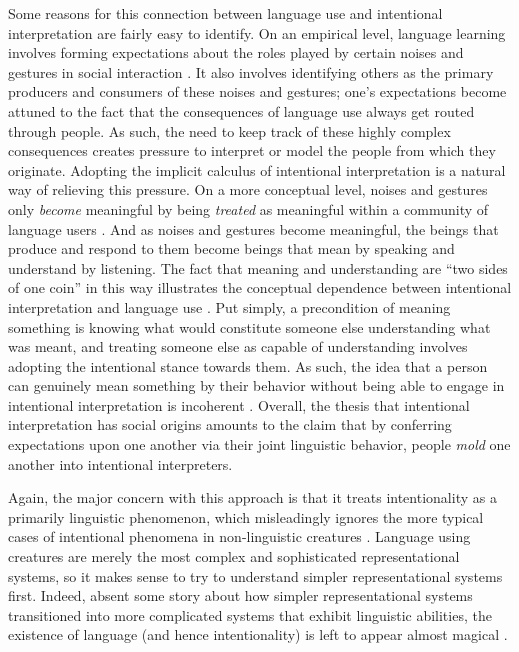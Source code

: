 Some reasons for this connection between language use and intentional interpretation are fairly easy to identify. On an empirical level, language learning involves forming expectations about the roles played by certain noises and gestures in social interaction \citep{Tomasello:2005,Tomasello:2003}. It also involves identifying others as the primary producers and consumers of these noises and gestures; one's expectations become attuned to the fact that the consequences of language use always get routed through people. As such, the need to keep track of these highly complex consequences creates pressure to interpret or model the people from which they originate. Adopting the implicit calculus of intentional interpretation is a natural way of relieving this pressure. On a more conceptual level, noises and gestures only \textit{become} meaningful by being \textit{treated} as meaningful within a community of language users \citep{Brandom:1994}. And as noises and gestures become meaningful, the beings that produce and respond to them become beings that mean by speaking and understand by listening. The fact that meaning and understanding are ``two sides of one coin'' in this way illustrates the conceptual dependence between intentional interpretation and language use \citep[][p. 206]{Brandom:1994}. Put simply, a precondition of meaning something is knowing what would constitute someone else understanding what was meant, and treating someone else as capable of understanding involves adopting the intentional stance towards them. As such, the idea that a person can genuinely mean something by their behavior without being able to engage in intentional interpretation is incoherent \citep{Brandom:1994}. Overall, the thesis that intentional interpretation has social origins amounts to the claim that by conferring expectations upon one another via their joint linguistic behavior, people \textit{mold} one another into intentional interpreters. 

Again, the major concern with this approach is that it treats intentionality as a primarily linguistic phenomenon, which misleadingly ignores the more typical cases of intentional phenomena in non-linguistic creatures \citep{Eliasmith:2000,Dennett:1987,Dennett:2010,Millikan:1989,Millikan:2005,Dretske:1986}. Language using creatures are merely the most complex and sophisticated representational systems, so it makes sense to try to understand simpler representational systems first. Indeed, absent some story about how simpler representational systems transitioned into more complicated systems that exhibit linguistic abilities, the existence of language (and hence intentionality) is left to appear almost magical \citep{Dennett:2010}. 

